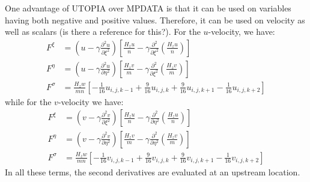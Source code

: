 One advantage of UTOPIA over MPDATA is that it can be used on
variables having both negative and positive values. Therefore,
it can be used on velocity as well as scalars (is there a reference for
this?). For the $u$-velocity, we have:
\begin{align}
   F^\xi &= \left(u - \gamma \frac{\partial^2 u}{\partial \xi^2} \right)
   \left[ \frac{H_z u}{n} - \gamma \frac{\partial^2}{\partial \xi^2}
   \left( \frac{H_z u}{n} \right) \right] \\
   F^\eta &= \left(u - \gamma \frac{\partial^2 u}{\partial \eta^2}
     \right)
   \left[ \frac{H_z v}{m} - \gamma \frac{\partial^2}{\partial \xi^2}
   \left( \frac{H_z v}{m} \right) \right] \\
   F^\sigma &= \frac{H_z w}{mn} \left[
     - \frac{1}{16} u_{i,j,k-1} + \frac{9}{16} u_{i,j,k} +
       \frac{9}{16} u_{i,j,k+1} - \frac{1}{16} u_{i,j,k+2} \right]
\end{align}
while for the $v$-velocity we have:
\begin{align}
   F^\xi &= \left(v - \gamma \frac{\partial^2 v}{\partial \xi^2} \right)
   \left[ \frac{H_z u}{n} - \gamma \frac{\partial^2}{\partial \eta^2}
   \left( \frac{H_z u}{n} \right) \right] \\
   F^\eta &= \left(v - \gamma \frac{\partial^2 v}{\partial \eta^2}
     \right)
   \left[ \frac{H_z v}{m} - \gamma \frac{\partial^2}{\partial \eta^2}
   \left( \frac{H_z v}{m} \right) \right] \\
   F^\sigma &= \frac{H_z w}{mn} \left[
     - \frac{1}{16} v_{i,j,k-1} + \frac{9}{16} v_{i,j,k} +
       \frac{9}{16} v_{i,j,k+1} - \frac{1}{16} v_{i,j,k+2} \right]
\end{align}
In all these terms, the second derivatives are evaluated at an upstream
location.

